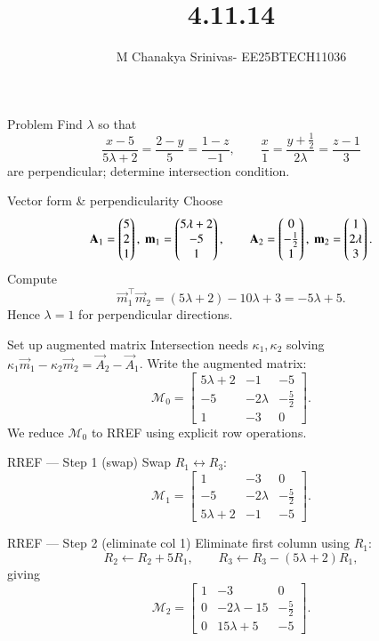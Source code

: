 \documentclass{beamer}
\title %
{4.11.14}
\date{}
\author %
{M Chanakya Srinivas- EE25BTECH11036}
\begin{document}
\frame{\titlepage}



\begin{frame}{Problem}
Find \(\lambda\) so that
\[
\frac{x-5}{5\lambda+2}=\frac{2-y}{5}=\frac{1-z}{-1},\qquad
\frac{x}{1}=\frac{y+\tfrac12}{2\lambda}=\frac{z-1}{3}
\]
are perpendicular; determine intersection condition.
\end{frame}

\begin{frame}{Vector form \& perpendicularity}
Choose
\[
\vec{A}_1=\myvec{5\\2\\1},\ \vec{m}_1=\myvec{5\lambda+2\\-5\\1},\qquad
\vec{A}_2=\myvec{0\\-\tfrac12\\1},\ \vec{m}_2=\myvec{1\\2\lambda\\3}.
\]
Compute
\[
\vec{m}_1^\top\vec{m}_2 = (5\lambda+2)-10\lambda+3 = -5\lambda+5.
\]
Hence \(\boxed{\lambda=1}\) for perpendicular directions.
\end{frame}

\begin{frame}{Set up augmented matrix}
Intersection needs \(\kappa_1,\kappa_2\) solving
\(\kappa_1\vec{m}_1-\kappa_2\vec{m}_2=\vec{A}_2-\vec{A}_1\).
Write the augmented matrix:
\[
\mathcal{M}_0 =
\left[\begin{array}{cc|c}
5\lambda+2 & -1 & -5 \\[2pt]
-5 & -2\lambda & -\tfrac{5}{2} \\[2pt]
1 & -3 & 0
\end{array}\right].
\]
We reduce \(\mathcal{M}_0\) to RREF using explicit row operations.
\end{frame}

\begin{frame}{RREF — Step 1 (swap)}
Swap \(R_1\leftrightarrow R_3\):
\[
\mathcal{M}_1 =
\left[\begin{array}{cc|c}
1 & -3 & 0 \\
-5 & -2\lambda & -\tfrac{5}{2} \\
5\lambda+2 & -1 & -5
\end{array}\right].
\]
\end{frame}

\begin{frame}{RREF — Step 2 (eliminate col 1)}
Eliminate first column using \(R_1\):
\[
R_2\leftarrow R_2+5R_1,\qquad R_3\leftarrow R_3-(5\lambda+2)R_1,
\]
giving
\[
\mathcal{M}_2 =
\left[\begin{array}{cc|c}
1 & -3 & 0 \\
0 & -2\lambda-15 & -\tfrac{5}{2} \\
0 & 15\lambda+5 & -5
\end{array}\right].
\]
\end{frame}
\end{document}

